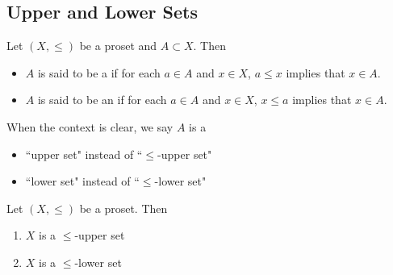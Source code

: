 \documentclass{book}
\begin{document}
	
	
	
	
	
	
	
	
	
	
	
	
	
	
	
	
	
	
	
	
	
	
	
	
	
	
	
	
	
	
	
	
	
	
	
	
	
	
	
	
	
	
	
	
	
	
	
	
	\subsection{Upper and Lower Sets}
	
	\begin{defn} 
		Let $(X, \leq)$ be a proset and $A \subset X$. Then 
		\begin{itemize}
			\item $A$ is said to be a  if for each $a \in A$ and $x \in X$, $a \leq x$ implies that $x \in A$.
			\item $A$ is said to be an  if for each $a \in A$ and $x \in X$, $x \leq a$ implies that $x \in A$.
		\end{itemize}
	\end{defn}
	
	\begin{note}
		When the context is clear, we say $A$ is a
		\begin{itemize}
			\item ``upper set" instead of ``$\leq$-upper set"
			\item ``lower set" instead of ``$\leq$-lower set"
		\end{itemize}
	\end{note}
	
	\begin{ex} 
		Let $(X, \leq)$ be a proset. Then 
		\begin{enumerate}
			\item $X$ is a $\leq$-upper set 
			\item $X$ is a $\leq$-lower set
		\end{enumerate}
	\end{ex}
	
\end{document}
